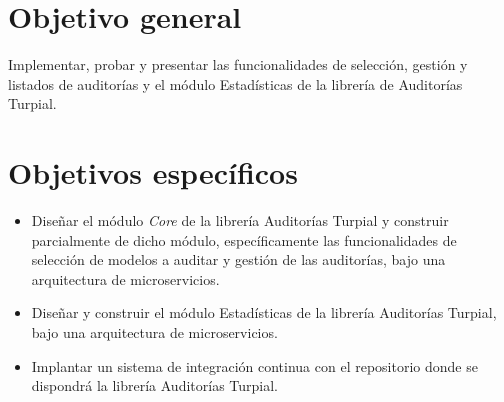 \section{Objetivo general}

Implementar, probar y presentar las funcionalidades de selección, gestión y
listados de auditorías y el módulo Estadísticas de la librería de Auditorías Turpial.

\section{Objetivos específicos}

\begin{itemize}
    \item Diseñar el módulo \textit{Core} de la librería Auditorías Turpial y construir parcialmente de dicho módulo, específicamente las funcionalidades de selección de modelos a auditar y gestión de las auditorías, bajo una arquitectura de microservicios.
    \item Diseñar y construir el módulo Estadísticas de la librería Auditorías Turpial, bajo una arquitectura de microservicios.
    \item Implantar un sistema de integración continua con el repositorio donde se dispondrá la librería Auditorías Turpial.
\end{itemize}
